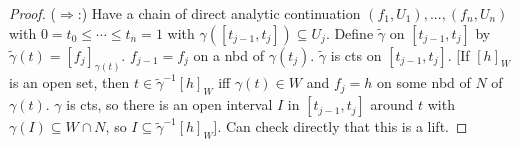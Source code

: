 \documentclass{article}
\theoremstyle{definition}
\theoremstyle{remark}
\theoremstyle{plain}
\begin{document}
\begin{proof}
    ($\Rightarrow$:)%
    Have a chain of direct analytic continuation $(f_1,U_1),...,(f_n,U_n)$ with $0= t_0\le \cdots \le t_n=1$ with $\gamma([t_{j-1},t_j])\subseteq U_j$. Define $\tilde\gamma$ on $[t_{j-1},t_j]$ by $\tilde\gamma(t)=[f_j]_{\gamma(t)}$. $f_{j-1}=f_j$ on a nbd of $\gamma(t_j)$. $\tilde \gamma $ is  cts on $[t_{j-1},t_j]$. [If $[h]_W$ is an open set, then $t\in \tilde\gamma^{-1}[h]_W$ iff $\gamma(t)\in W$ and $f_j=h$ on some nbd of $N$ of $\gamma(t)$. $\gamma$ is cts, so there is an open interval $I$ in $[t_{j-1},t_j]$ around $t$ with $\gamma(I)\subseteq W\cap N$, so $I\subseteq \tilde\gamma^{-1}[h]_W$]. Can check directly that this is a lift.
\end{proof}
\end{document}

